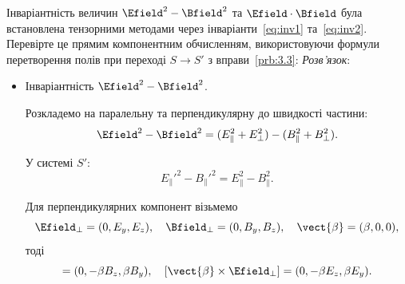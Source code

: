 \begin{problem}
    Інваріантність величин $\Efield^{2}-\Bfield^{2}$ та $\Efield\cdot\Bfield$
    була встановлена тензорними методами через інваріанти~\eqref{eq:inv1}
    та~\eqref{eq:inv2}. Перевірте це прямим компонентним обчисленням,
    використовуючи формули перетворення полів при переході $S\to S'$
    з вправи~\ref{prb:3.3}:
    \vspace{1ex}
    \textit{Розв'язок}:
    \begin{itemize}
        \item Інваріантність $\Efield^2 - \Bfield^2$.

              Розкладемо на паралельну та перпендикулярну до швидкості частини:
              \begin{equation*}
                  \Efield^2 - \Bfield^2 = (E_\parallel^2 + E_\perp^2) - (B_\parallel^2 + B_\perp^2).
              \end{equation*}

              У системі $S'$:
              \begin{equation*}
                  E_\parallel'^2 - B_\parallel'^2 = E_\parallel^2 - B_\parallel^2.
              \end{equation*}

              Для перпендикулярних компонент візьмемо
              \begin{equation*}
                  \Efield_\perp = (0, E_y, E_z), \quad \Bfield_\perp = (0, B_y, B_z), \quad \vect{\beta} = (\beta, 0, 0),
              \end{equation*}
              тоді
              \begin{equation*}
                  [\vect{\beta}\times \Bfield_\perp] = (0, -\beta B_z, \beta B_y), \quad
                  [\vect{\beta}\times \Efield_\perp] = (0, -\beta E_z, \beta E_y).
              \end{equation*}


\end{itemize}
\end{problem}

